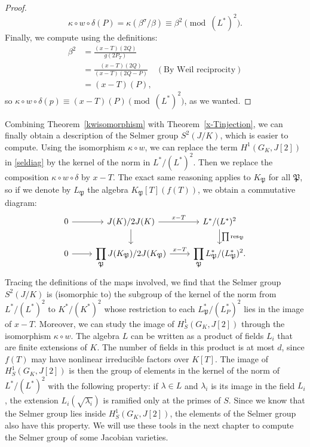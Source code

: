 \documentclass[a4paper, 12pt]{amsart}
\theoremstyle{definition}
\theoremstyle{plain}
\theoremstyle{plain}
\theoremstyle{plain}
\theoremstyle{plain}
\theoremstyle{remark}
\theoremstyle{remark}
\theoremstyle{plain}
\newcommand{\thmref}[1]{Theorem~\ref{#1}}
\renewcommand{\P}{\mathfrak{P}}
\begin{document}
\begin{proof}
		\begin{equation*}
			\kappa\circ w\circ \delta(P)=\kappa(\beta^\sigma/\beta)\equiv\beta^2\pmod{(L^*)^2}.
		\end{equation*}
		Finally, we compute using the definitions:
		\begin{align*}
			\beta^2&=\frac{(x-T)(2Q)}{g(2P_T)}\\
			&=\frac{(x-T)(2Q)}{(x-T)(2Q-P)}\quad(\text{By Weil reciprocity})\\
			&=(x-T)(P),
		\end{align*}
		so $\kappa\circ w\circ\delta(p)\equiv (x-T)(P)\pmod{(L^*)^2}$, as we wanted.
	\end{proof}
	Combining \thmref{kwisomorphism} with \thmref{x-Tinjection}, we can finally obtain a description of the Selmer group $S^2(J/K)$, which is easier to compute. Using the isomorphism $\kappa\circ w$, we can replace the term $H^1(G_K,J[2])$ in \eqref{seldiag} by the kernel of the norm in $L^*/(L^*)^2$. Then we replace the composition $\kappa\circ w\circ\delta$ by $x-T$. The exact same reasoning applies to $K_\P$ for all $\P$, so if we denote by $L_\P$ the algebra $K_\P[T](f(T))$, we obtain a commutative diagram:
	\begin{equation*}
		\begin{tikzcd}
			0\arrow[r]
			&J(K)/2J(K)\arrow{r}{x-T}\arrow{d}
			&L^*/(L^*)^2\arrow{d}{\prod\text{res}_\P}
			\\
			0\arrow[r]
			&\displaystyle \prod_\P J(K_\P)/2J(K_\P)\arrow{r}{x-T}
			&\displaystyle \prod_\P L_\P^*/(L_\P^*)^2.
		\end{tikzcd}
	\end{equation*}
	Tracing the definitions of the maps involved, we find that the Selmer group $S^2(J/K)$ is (isomorphic to) the subgroup of the kernel of the norm from $L^*/(L^*)^2$ to $K^*/(K^*)^2$ whose restriction to each $L_\P^*/(L_P^*)^2$ lies in the image of $x-T$. Moreover, we can study the image of $H^1_S(G_K,J[2])$ through the isomorphism $\kappa\circ w$. The algebra $L$ can be written as a product of fields $L_i$ that are finite extensions of $K$. The number of fields in this product is at most $d$, since $f(T)$ may have nonlinear irreducible factors over $K[T]$. The image of $H^1_S(G_K,J[2])$ is then the group of elements in the kernel of the norm of $L^*/(L^*)^2$ with the following property: if $\lambda\in L$ and $\lambda_i$ is its image in the field $L_i$, the extension $L_i(\sqrt{\lambda_i})$ is ramified only at the primes of $S$. Since we know that the Selmer group lies inside $H^1_S(G_K,J[2])$, the elements of the Selmer group also have this property. We will use these tools in the next chapter to compute the Selmer group of some Jacobian varieties.
	
\end{document}

